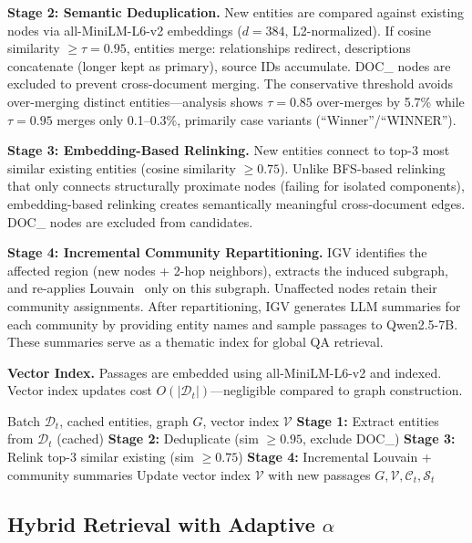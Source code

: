 \documentclass[sigconf,anonymous,review]{acmart}
\begin{document}
\textbf{Stage 2: Semantic Deduplication.} New entities are compared against existing nodes via all-MiniLM-L6-v2 embeddings ($d{=}384$, L2-normalized). If cosine similarity $\geq\tau{=}0.95$, entities merge: relationships redirect, descriptions concatenate (longer kept as primary), source IDs accumulate. DOC\_ nodes are excluded to prevent cross-document merging. The conservative threshold avoids over-merging distinct entities---analysis shows $\tau{=}0.85$ over-merges by 5.7\% while $\tau{=}0.95$ merges only 0.1--0.3\%, primarily case variants (``Winner''/``WINNER'').

\textbf{Stage 3: Embedding-Based Relinking.} New entities connect to top-3 most similar existing entities (cosine similarity $\geq 0.75$). Unlike BFS-based relinking that only connects structurally proximate nodes (failing for isolated components), embedding-based relinking creates semantically meaningful cross-document edges. DOC\_ nodes are excluded from candidates.

\textbf{Stage 4: Incremental Community Repartitioning.} IGV identifies the affected region (new nodes + 2-hop neighbors), extracts the induced subgraph, and re-applies Louvain~\cite{blondel2008louvain} only on this subgraph. Unaffected nodes retain their community assignments. After repartitioning, IGV generates LLM summaries for each community by providing entity names and sample passages to Qwen2.5-7B. These summaries serve as a thematic index for global QA retrieval.

\textbf{Vector Index.} Passages are embedded using all-MiniLM-L6-v2 and indexed. Vector index updates cost $O(|\mathcal{D}_t|)$---negligible compared to graph construction.

\begin{algorithm}[t]
\caption{IGV Incremental Update}
\label{alg:igv}
\begin{algorithmic}[1]
\Require Batch $\mathcal{D}_t$, cached entities, graph $G$, vector index $\mathcal{V}$
\State \textbf{Stage 1:} Extract entities from $\mathcal{D}_t$ (cached)
\State \textbf{Stage 2:} Deduplicate (sim $\geq 0.95$, exclude DOC\_)
\State \textbf{Stage 3:} Relink top-3 similar existing (sim $\geq 0.75$)
\State \textbf{Stage 4:} Incremental Louvain + community summaries
\State Update vector index $\mathcal{V}$ with new passages
\State \Return $G, \mathcal{V}, \mathcal{C}_t, \mathcal{S}_t$
\end{algorithmic}
\end{algorithm}

\subsection{Hybrid Retrieval with Adaptive $\alpha$}
\end{document}
